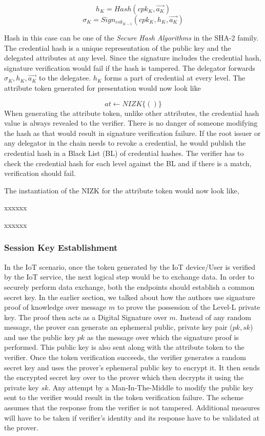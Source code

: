 \documentclass[journal]{IEEEtran}
\begin{document}
$$
h_K = Hash(cpk_K,\overrightarrow{a_K})
$$
$$
\sigma_K = Sign_{csk_{K-1}}(cpk_K,h_K,\overrightarrow{a_K})
$$

Hash in this case can be one of the \textit{Secure Hash Algorithms} in the SHA-2 family. The credential hash is a unique representation of the public key and the delegated attributes at any level. Since the signature includes the credential hash, signature verification would fail if the hash is tampered. The delegator forwards $\sigma_K, h_K, \overrightarrow{a_K}$ to the delegatee. $h_K$ forms a part of credential at every level. The attribute token generated for presentation would now look like

$$
at \leftarrow NIZK \lbrace(  )\rbrace
$$
When generating the attribute token, unlike other attributes, the credential hash value is always revealed to the verifier. There is no danger of someone modifying the hash as that would result in signature verification failure. If the root issuer or any delegator in the chain needs to revoke a credential, he would publish the credential hash in a Black List (BL) of credential hashes. The verifier has to check the credential hash for each level against the BL and if there is a match,  verification should fail.

The instantiation of the NIZK for the attribute token would now look like,


xxxxxx 


xxxxxx

\subsubsection{Session Key Establishment}
In the IoT scenario, once the token generated by the IoT device/User is verified by the IoT service, the next logical step would be to exchange data. In order to securely perform data exchange, both the endpoints should establish a common secret key. In the earlier section, we talked about how the authors use signature proof of knowledge over message $m$ to prove the possession of the Level-L private key. The proof then acts as a Digital Signature over $m$. Instead of any random message, the prover can generate an ephemeral public, private key pair ($pk,sk$) and use the public key $pk$ as the message over which the signature proof is performed. This public key is also sent along with the attribute token to the verifier. Once the token verification succeeds, the verifier generates a random secret key and uses the prover's ephemeral public key to encrypt it. It then sends the encrypted secret key over to the prover which then decrypts it using the private key $sk$. Any attempt by a Man-In-The-Middle to modify the public key sent to the verifier would result in the token verification failure. The scheme assumes that the response from the verifier is not tampered. Additional measures will have to be taken if verifier's identity and its response have to be validated at the prover.
\end{document}

